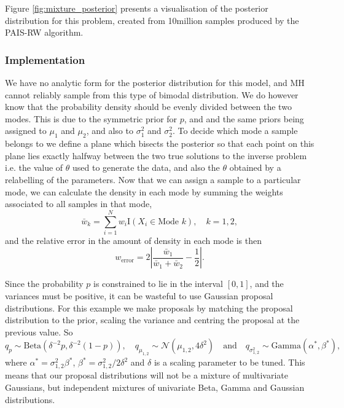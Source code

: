 \documentclass[final]{siamltex}
\begin{document}
Figure \ref{fig:mixture_posterior} presents a visualisation of the
posterior distribution for this problem, created from 10million
samples produced by the PAIS-RW algorithm.


\subsubsection{Implementation}
\label{sec:mixture_implementation}

We have no analytic form for the posterior distribution for this
model, and MH cannot reliably sample from this type of bimodal
distribution. We do however know that the probability density should
be evenly divided between the two modes. This is due to the symmetric
prior for $p$, and and the same priors being assigned to $\mu_1$ and
$\mu_2$, and also to $\sigma^2_1$ and $\sigma^2_2$. To decide which
mode a sample belongs to we define a plane which bisects the posterior
so that each point on this plane lies exactly halfway between the two
true solutions to the inverse problem i.e. the value of $\theta$ used
to generate the data, and also the $\theta$ obtained by a relabelling
of the parameters. Now that we can assign a sample to a particular
mode, we can calculate the density in each mode by summing the weights
associated to all samples in that mode,
\[
	\bar{w}_k = \sum\limits_{i=1}^N w_i\text{I}(X_i \in \text{Mode $k$}), \quad k = 1, 2,
\]
and the relative error in the amount of density in each mode is then
\begin{equation}\label{eqn:mode_prop}
	w_\text{error} = 2\left|\frac{\bar{w}_1}{\bar{w}_1+\bar{w}_2} - \frac{1}{2}\right|.
\end{equation}

Since the probability $p$ is constrained to lie in the interval
$[0,1]$, and the variances must be positive, it can be wasteful to use
Gaussian proposal distributions. For this example we make proposals by
matching the proposal distribution to the prior, scaling the variance
and centring the proposal at the previous value. So
\[
	q_p \sim \text{Beta}(\delta^{-2}p, \delta^{-2}(1-p)), \quad q_{\mu_{1,2}} \sim \mathcal{N}(\mu_{1,2}, 4\delta^2) \quad \text{and} \quad q_{\sigma^2_{1,2}} \sim \text{Gamma}(\alpha^*, \beta^*),
\]
where $\alpha^* = \sigma^2_{1,2}\beta^*$, $\beta^* =
\sigma^2_{1,2}/2\delta^2$ and $\delta$ is a scaling parameter to be
tuned. This means that our proposal distributions will not be a
mixture of multivariate Gaussians, but independent mixtures of
univariate Beta, Gamma and Gaussian distributions.
\end{document}

